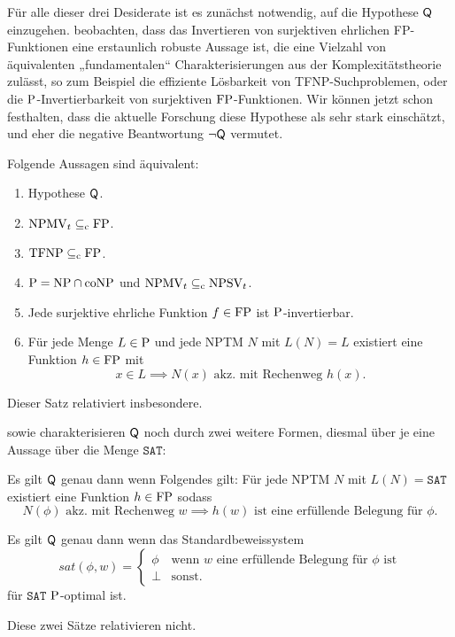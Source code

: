 Für alle dieser drei Desiderate ist es zunächst notwendig, auf die Hypothese $\hQ$ einzugehen.
\textcite{fenner_inverting_2003} beobachten, dass das Invertieren von surjektiven ehrlichen FP-Funktionen eine erstaunlich robuste Aussage ist, die eine Vielzahl von äquivalenten „fundamentalen“ \parencite*[91]{fenner_inverting_2003} Charakterisierungen aus der Komplexitätstheorie zulässt, so zum Beispiel die effiziente Lösbarkeit von TFNP-Suchproblemen, oder die $\P$-Invertierbarkeit von surjektiven $\FP$-Funktionen. Wir können jetzt schon festhalten, dass die aktuelle Forschung diese Hypothese als sehr stark einschätzt, und eher die negative Beantwortung $\neg\hQ$ vermutet.


\begin{theorem}\label{thm:q-orig}
    Folgende Aussagen sind äquivalent:
    \begin{enumerate}
        \item Hypothese $\hQ$.
        \item $\mathrm{NPMV}_t\subseteqc \mathrm{FP}$.
        \item $\TFNP\subseteqc \mathrm{FP}$.
        \item $\P=\NP\cap\coNP$ und $\mathrm{NPMV}_t\subseteqc \mathrm{NPSV}_t$.
        \item Jede surjektive ehrliche Funktion $f\in\FP$ ist $\P$-invertierbar.
        \item Für jede Menge $L\in \P$  und jede NPTM $N$ mit $L(N)=L$ existiert eine Funktion $h\in \FP$ mit 
            \[ x\in L \implies N(x) \text{ akz. mit Rechenweg $h(x)$}. \]
    \end{enumerate}
\end{theorem}
Dieser Satz relativiert insbesondere.

\textcite{fenner_inverting_2003} sowie \textcite{kobler_is_2000} charakterisieren $\hQ$ noch durch zwei weitere Formen, diesmal über je eine Aussage über die Menge $\mathtt{SAT}$:

\begin{theorem}\label{thm:q-fenner}
    Es gilt $\hQ$ genau dann wenn Folgendes gilt: Für jede NPTM $N$ mit $L(N)=\mathtt{SAT}$ existiert eine Funktion $h\in \FP$ sodass 
\[ N(\phi) \text{ akz. mit Rechenweg $w$} \implies \text{$h(w)$ ist eine erfüllende Belegung für $\phi$.} \]
\end{theorem}
\begin{theorem}\label{thm:q-messner}
    Es gilt $\hQ$ genau dann wenn das Standardbeweissystem
            \[ \mathit{sat}(\phi, w) = \begin{cases} \phi & \text{wenn $w$ eine erfüllende Belegung für $\phi$ ist} \\ \bot & \text{sonst.} \end{cases}\]
            für $\mathtt{SAT}$ $\P$-optimal ist.
\end{theorem}
Diese zwei Sätze relativieren nicht.

